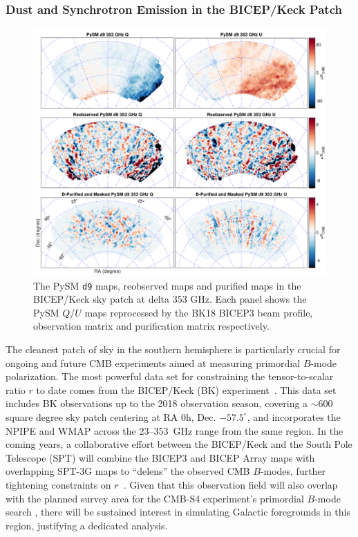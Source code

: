 \documentclass[twocolumn]{aastex631}
\begin{document}
\subsubsection{Dust and Synchrotron Emission in the BICEP/Keck Patch}
\label{sec:BK_validation}
\begin{figure}
    \centering
    \includegraphics[width=2.\columnwidth]{figures/pysm_d9_353_delta_reobs_B_pub.pdf}
    \caption{The PySM \texttt{d9} maps, reobserved maps and purified maps in the BICEP/Keck sky patch at delta 353 GHz. Each panel shows the
    PySM $Q$/$U$ maps reprocessed by the BK18 BICEP3 beam profile, observation matrix and purification matrix respectively.}
    \label{fig:psym_BKmatrix}
\end{figure}

The cleanest patch of sky in the southern hemisphere is particularly crucial for ongoing and future CMB experiments aimed at measuring primordial $B$-mode polarization. The most powerful data set for constraining the tensor-to-scalar ratio $r$ to date comes from the BICEP/Keck (BK) experiment~\citep[``BK18'';][]{Ade:2021}. This data set includes BK observations up to the 2018 observation season, covering a $\sim 600$ square degree sky patch centering at RA 0h, Dec. $-57.5^{\circ}$, and incorporates the NPIPE and WMAP across the 23--353~GHz range from the same region. In the coming years, a collaborative effort between the BICEP/Keck and the South Pole Telescope (SPT) will combine the BICEP3 and BICEP Array maps with overlapping SPT-3G maps to ``delens'' the observed CMB $B$-modes, further tightening constraints on $r$~\citep{TheBICEP/KeckCollaboration:2024}. Given that this observation field will also overlap with the planned survey area for the CMB-S4 experiment's primordial $B$-mode search \citep{Abazajian:2022}, there will be sustained interest in simulating Galactic foregrounds in this region, justifying a dedicated analysis. 
\end{document}
